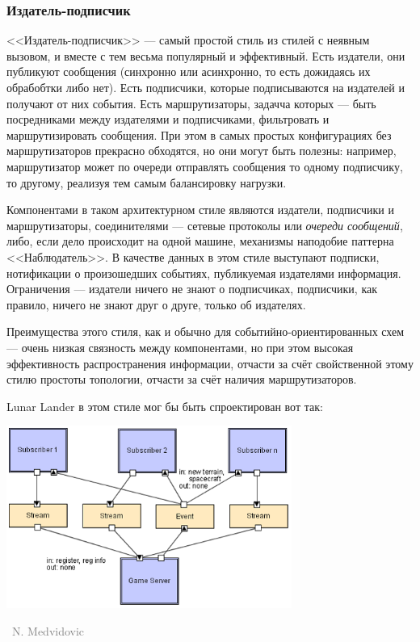 \documentclass[a5paper]{article}
\newcommand{\attribution}[1] {
    \vspace{-4mm}\begin{flushright}\begin{scriptsize}\textcolor{gray}
    {\textcopyright\, #1}\end{scriptsize}\end{flushright}
}
\begin{document}
\subsubsection{Издатель-подписчик}

<<Издатель-подписчик>> --- самый простой стиль из стилей с неявным вызовом, и вместе с тем весьма популярный и эффективный. Есть издатели, они публикуют сообщения (синхронно или асинхронно, то есть дожидаясь их обрабобтки либо нет). Есть подписчики, которые подписываются на издателей и получают от них события. Есть маршрутизаторы, задачча которых --- быть посредниками между издателями и подписчиками, фильтровать и маршрутизировать сообщения. При этом в самых простых конфигурациях без маршрутизаторов прекрасно обходятся, но они могут быть полезны: например, маршрутизатор может по очереди отправлять сообщения то одному подписчику, то другому, реализуя тем самым балансировку нагрузки.

Компонентами в таком архитектурном стиле являются издатели, подписчики и маршрутизаторы, соединителями --- сетевые протоколы или \textit{очереди сообщений}, либо, если дело происходит на одной машине, механизмы наподобие паттерна <<Наблюдатель>>. В качестве данных в этом стиле выступают подписки, нотификации о произошедших событиях, публикуемая издателями информация. Ограничения --- издатели ничего не знают о подписчиках, подписчики, как правило, ничего не знают друг о друге, только об издателях.

Преимущества этого стиля, как и обычно для событийно-ориентированных схем --- очень низкая связность между компонентами, но при этом высокая эффективность распространения информации, отчасти за счёт свойственной этому стилю простоты топологии, отчасти за счёт наличия маршрутизаторов.

Lunar Lander в этом стиле мог бы быть спроектирован вот так:

\begin{center}
    \includegraphics[width=0.7\textwidth]{pubSubLL.png}
    \attribution{N. Medvidovic}
\end{center}
\end{document}
